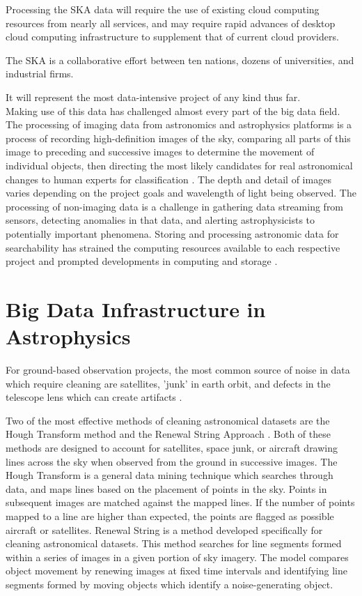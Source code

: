 \documentclass[sigconf]{acmart}
\begin{document}
Processing the SKA data will require the use of existing cloud computing resources from nearly all services, and may require rapid advances of desktop cloud computing infrastructure to supplement that of current cloud providers\cite{Newman2011}. 

The SKA is a collaborative effort between ten nations, dozens of universities, and industrial firms. 

It will represent the most data-intensive project of any kind thus far\cite{IBM2012}. \\

Making use of this data has challenged almost every part of the big data field. The processing of imaging data from astronomics and astrophysics platforms is a process of recording high-definition images of the sky, comparing all parts of this image to preceding and successive images to determine the movement of individual objects, then directing the most likely candidates for real astronomical changes to human experts for classification \cite{Enke2012}. The depth and detail of images varies depending on the project goals and wavelength of light being observed. The processing of non-imaging data is a challenge in gathering data streaming from sensors, detecting anomalies in that data, and alerting astrophysicists to potentially important phenomena. Storing and processing astronomic data for searchability has strained the computing resources available to each respective project and prompted developments in computing and storage \cite{IBM2012}. 



\section{Big Data Infrastructure in Astrophysics} 

For ground-based observation projects, the most common source of noise in data which require cleaning are satellites, 'junk' in earth orbit, and defects in the telescope lens which can create artifacts \cite{Storkey2003a}. 

Two of the most effective methods of cleaning astronomical datasets are the Hough Transform method and the Renewal String Approach \cite{Antolovic2008,Storkey2003,Storkey2003a}. Both of these methods are designed to account for satellites, space junk, or aircraft drawing lines across the sky when observed from the ground in successive images. The Hough Transform is a general data mining technique which searches through data, and maps lines based on the placement of points in the sky. Points in subsequent images are matched against the mapped lines. If the number of points mapped to a line are higher than expected, the points are flagged as possible aircraft or satellites.  Renewal String is a method developed specifically for cleaning astronomical datasets. This method searches for line segments formed within a series of images in a given portion of sky imagery. The model compares object movement by renewing images at fixed time intervals and identifying line segments formed by moving objects which identify a noise-generating object\cite{Storkey2003}.\\
\end{document}
